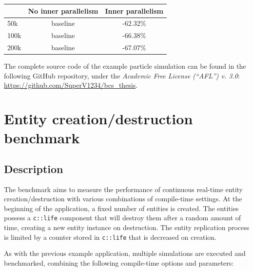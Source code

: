 \documentclass[oneside, 12pt, a4paper, openany]{book}
\begin{document}
\begin{itemize}
  \begin{longtable}[]{@{}lcc@{}}
  \toprule
  \begin{minipage}[b]{0.32\columnwidth}\raggedright\strut
  \strut
  \end{minipage} & \begin{minipage}[b]{0.32\columnwidth}\centering\strut
  No inner parallelism\strut
  \end{minipage} & \begin{minipage}[b]{0.32\columnwidth}\centering\strut
  Inner parallelism\strut
  \end{minipage}\tabularnewline
  \midrule
  \endhead
  50k & baseline & -62.32\%\tabularnewline
  100k & baseline & -66.38\%\tabularnewline
  200k & baseline & -67.07\%\tabularnewline
  \bottomrule
  \end{longtable}
\end{itemize}

The complete source code of the example particle simulation can be found
in the following GitHub repository, under the \emph{Academic Free
License (``AFL'') v. 3.0}:
\url{https://github.com/SuperV1234/bcs_thesis}.

\chapter{Entity creation/destruction
benchmark}\label{entity-creationdestruction-benchmark}

\section{Description}\label{description-1}

The benchmark aims to measure the performance of continuous real-time
entity creation/destruction with various combinations of compile-time
settings. At the beginning of the application, a fixed number of
entities is created. The entities possess a
\texttt{c::life}
component that will destroy them after a random amount of time, creating
a new entity instance on destruction. The entity replication process is
limited by a counter stored in
\texttt{c::life}
that is decreased on creation.

As with the previous example application, multiple simulations are
executed and benchmarked, combining the following compile-time options
and parameters:
\end{document}
